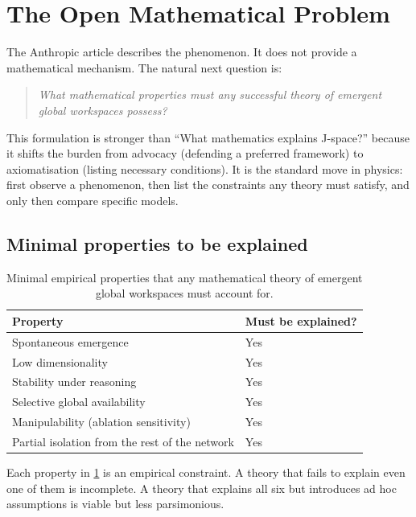 \documentclass[11pt,a4paper]{article}
\theoremstyle{definition}
\begin{document}
\section{The Open Mathematical Problem}
\label{sec:open}

The Anthropic article describes the phenomenon. It does not provide a
mathematical mechanism. The natural next question is:

\begin{quote}
\textit{What mathematical properties must any successful theory of emergent
global workspaces possess?}
\end{quote}

This formulation is stronger than ``What mathematics explains J-space?''
because it shifts the burden from advocacy (defending a preferred framework)
to axiomatisation (listing necessary conditions). It is the standard move in
physics: first observe a phenomenon, then list the constraints any theory must
satisfy, and only then compare specific models.

\subsection{Minimal properties to be explained}

\begin{table}[htbp]
\centering
\begin{tabular}{@{}ll@{}}
\toprule
\textbf{Property} & \textbf{Must be explained?} \\
\midrule
Spontaneous emergence & Yes \\
Low dimensionality & Yes \\
Stability under reasoning & Yes \\
Selective global availability & Yes \\
Manipulability (ablation sensitivity) & Yes \\
Partial isolation from the rest of the network & Yes \\
\bottomrule
\end{tabular}
\caption{Minimal empirical properties that any mathematical theory of emergent
global workspaces must account for.}
\label{tab:properties}
\end{table}

\noindent
Each property in \cref{tab:properties} is an empirical constraint. A theory
that fails to explain even one of them is incomplete. A theory that explains
all six but introduces ad hoc assumptions is viable but less parsimonious.
\end{document}
